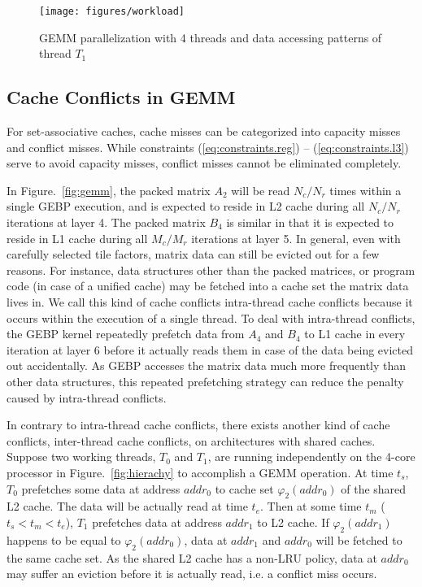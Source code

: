 \begin{figure}[t]
  \centering
  \texttt{[image: figures/workload]}
  \caption{GEMM parallelization with 4 threads and data accessing patterns of thread $T_1$}
  \label{fig:workload}
\end{figure}

\subsection{Cache Conflicts in GEMM}\label{subsec:cache-conflicts}

For set-associative caches, cache misses can be categorized
into capacity misses and conflict misses.
While constraints (\ref{eq:constraints.reg}) -- (\ref{eq:constraints.l3})
serve to avoid capacity misses,
conflict misses cannot be eliminated completely.

In Figure.~\ref{fig:gemm}, the packed matrix $A_2$
will be read $N_c/N_r$ times within a single GEBP execution,
and is expected to reside in L2 cache during all $N_c/N_r$ iterations at layer 4.
The packed matrix $B_4$ is similar in that it is expected to
reside in L1 cache during all $M_c/M_r$ iterations at layer 5.
In general, even with carefully selected tile factors,
matrix data can still be evicted out for a few reasons.
For instance, data structures other than the packed matrices,
or program code (in case of a unified cache) may be fetched into a
cache set the matrix data lives in.
We call this kind of cache conflicts intra-thread cache conflicts
because it occurs within the execution of a single thread.
To deal with intra-thread conflicts,
the GEBP kernel repeatedly prefetch data from $A_4$ and $B_4$ to L1 cache
in every iteration at layer 6 before it actually reads them in case of
the data being evicted out accidentally.
As GEBP accesses the matrix data much more frequently than other
data structures, this repeated prefetching strategy
can reduce the penalty caused by intra-thread conflicts.

In contrary to intra-thread cache conflicts,
there exists another kind of cache conflicts,
inter-thread cache conflicts, on architectures with shared caches.
Suppose two working threads, $T_0$ and $T_1$, are running independently
on the 4-core processor in Figure.~\ref{fig:hierachy}
to accomplish a GEMM operation.
At time $t_s$, $T_0$ prefetches some data at address $addr_0$
to cache set $\varphi_2(addr_0)$ of the shared L2 cache.
The data will be actually read at time $t_e$.
Then at some time $t_m$ ($t_s < t_m < t_e$),
$T_1$ prefetches data at address $addr_1$ to L2 cache.
If $\varphi_2(addr_1)$ happens to be equal to $\varphi_2(addr_0)$,
data at $addr_1$ and $addr_0$ will be fetched to the same cache set.
As the shared L2 cache has a non-LRU policy,
data at $addr_0$ may suffer an eviction before it is actually read,
i.e. a conflict miss occurs.

